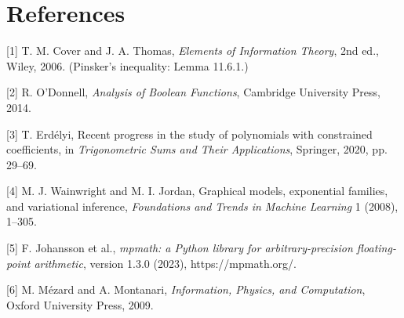 \documentclass[11pt]{article}
\begin{document}
\section*{References}
[1] T. M. Cover and J. A. Thomas, \emph{Elements of Information Theory}, 2nd ed., Wiley, 2006.  (Pinsker's inequality: Lemma 11.6.1.)

[2] R. O'Donnell, \emph{Analysis of Boolean Functions}, Cambridge University Press, 2014.

[3] T. Erdélyi, Recent progress in the study of polynomials with constrained coefficients, in \emph{Trigonometric Sums and Their Applications}, Springer, 2020, pp. 29–69.

[4] M. J. Wainwright and M. I. Jordan, Graphical models, exponential families, and variational inference, \emph{Foundations and Trends in Machine Learning} 1 (2008), 1–305.

[5] F. Johansson et al., \emph{mpmath: a Python library for arbitrary-precision floating-point arithmetic}, version 1.3.0 (2023), https://mpmath.org/.

[6] M. Mézard and A. Montanari, \emph{Information, Physics, and Computation}, Oxford University Press, 2009.
\end{document}
